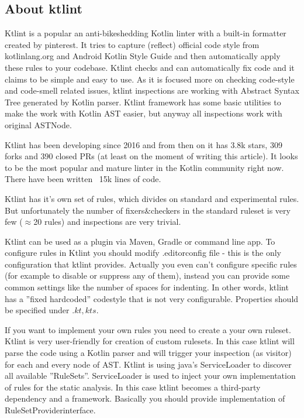 \subsection{About ktlint}
\par Ktlint is a popular an anti-bikeshedding Kotlin linter with a built-in formatter created by pinterest. It tries to capture (reflect) official code style from kotlinlang.org and Android Kotlin Style Guide and then automatically apply these rules to your codebase. Ktlint checks and can automatically fix code and it claims to be simple and easy to use. As it is focused more on checking code-style and code-smell related issues, ktlint inspections are working with Abstract Syntax Tree generated by Kotlin parser. Ktlint framework has some basic utilities to make the work with Kotlin AST easier, but anyway all inspections work with original ASTNode.

Ktlint has been developing since 2016 and from then on it has 3.8k stars, 309 forks and 390 closed PRs (at least on the moment of writing this article). It looks to be the most popular and mature linter in the Kotlin community right now. There have been written ~15k lines of code.

Ktlint has it’s own set of rules, which divides on standard and experimental rules. But unfortunately the number of fixers\&checkers in the standard ruleset is very few ($\approx$20 rules) and inspections are very trivial.

Ktlint can be used as a plugin via Maven, Gradle or command line app. To configure rules in Ktlint you should modify .editorconfig file - this is the only configuration that ktlint provides. Actually you even can’t configure specific rules (for example to disable or suppress any of them), instead you can provide some common settings like the number of spaces for indenting. In other words, ktlint has a ”fixed hardcoded” codestyle that is not very configurable. Properties should be specified under $.kt,kts$.

If you want to implement your own rules you need to create a your own ruleset. Ktlint is very user-friendly for creation of custom rulesets. In this case ktlint will parse the code using a Kotlin parser and will trigger your inspection (as visitor) for each and every node of AST. Ktlint is using java’s ServiceLoader to discover all available ”RuleSets”. ServiceLoader is used to inject your own implementation of rules for the static analysis. In this case ktlint becomes a third-party dependency and a framework. Basically you should provide implementation of RuleSetProviderinterface.

